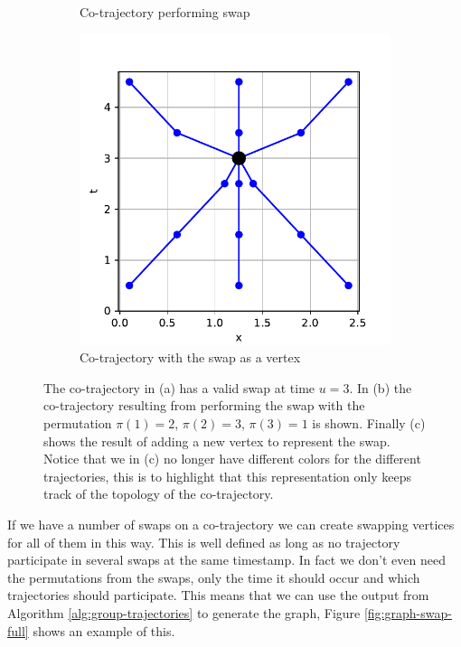 \documentclass[12pt]{article}
\newcommand{\swaptime}{u}
\theoremstyle{definition}
\begin{document}
\begin{figure}
\begin{subfigure}[t]{0.3\textwidth}
      \caption{Co-trajectory performing swap}
      \label{fig:graph-swap-b}
    \end{subfigure}
    \begin{subfigure}[t]{0.3\textwidth}
      \includegraphics[width=\textwidth]{graph-swap-c.pdf}
      \caption{Co-trajectory with the swap as a vertex}
      \label{fig:graph-swap-c}
    \end{subfigure}
    \caption{The co-trajectory in (a) has a valid swap at time
      \(\swaptime = 3\). In (b) the co-trajectory resulting from
      performing the swap with the permutation \(\pi(1) = 2\),
      \(\pi(2) = 3\), \(\pi(3) = 1\) is shown. Finally (c) shows the
      result of adding a new vertex to represent the swap. Notice that
      we in (c) no longer have different colors for the different
      trajectories, this is to highlight that this representation only
      keeps track of the topology of the co-trajectory.}
    \label{fig:graph-swap}
\end{figure}

If we have a number of swaps on a co-trajectory we can create swapping
vertices for all of them in this way. This is well defined as long as
no trajectory participate in several swaps at the same timestamp. In
fact we don't even need the permutations from the swaps, only the time
it should occur and which trajectories should participate. This means
that we can use the output from Algorithm \ref{alg:group-trajectories}
to generate the graph, Figure \ref{fig:graph-swap-full} shows an
example of this.
\end{document}
